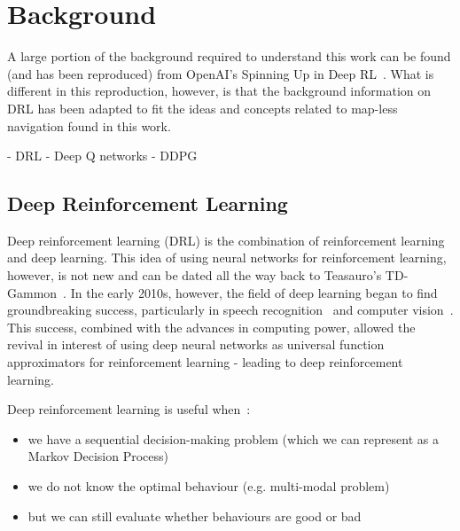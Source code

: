 
\chapter{Background}
\vspace{2em}

A large portion of the background required to understand this work can be found (and has been reproduced) from OpenAI's Spinning Up in Deep RL~\cite{SpinningUp2018}. What is different in this reproduction, however, is that the background information on DRL has been adapted to fit the ideas and concepts related to map-less navigation found in this work.

- DRL
- Deep Q networks
- DDPG

\section{Deep Reinforcement Learning}
Deep reinforcement learning (DRL) is the combination of reinforcement learning and deep learning. This idea of using neural networks for reinforcement learning, however, is not new and can be dated all the way back to Teasauro's TD-Gammon~\cite{tesauro_temporal_nodate}. In the early 2010s, however, the field of deep learning began to find groundbreaking success, particularly in speech recognition~\cite{dahl_context-dependent_2012} and computer vision~\cite{krizhevsky_imagenet_2017}. This success, combined with the advances in computing power, allowed the revival in interest of using deep neural networks as universal function approximators for reinforcement learning - leading to deep reinforcement learning.

Deep reinforcement learning is useful when~\cite{SpinningUp2018}:
\begin{itemize}
\item we have a sequential decision-making problem (which we can represent as a Markov Decision Process)
\item we do not know the optimal behaviour (e.g. multi-modal problem)
\item but we can still evaluate whether behaviours are good or bad
\end{itemize}

